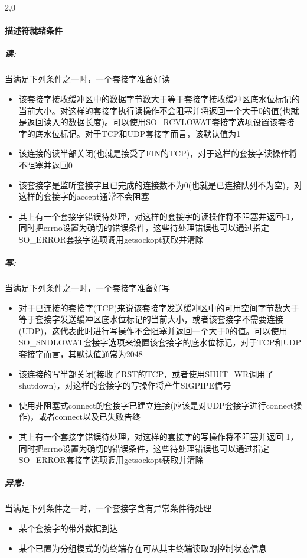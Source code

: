 \begin{spacing}{2,0}
\paragraph{描述符就绪条件}
\subparagraph{读:} 当满足下列条件之一时，一个套接字准备好读
\begin{itemize}
	\item[1.] 该套接字接收缓冲区中的数据字节数大于等于套接字接收缓冲区底水位标记的当前大小。对这样的套接字执行读操作不会阻塞并将返回一个大于0的值(也就是返回读入的数据长度)。可以使用SO\_RCVLOWAT套接字选项设置该套接字的底水位标记。对于TCP和UDP套接字而言，该默认值为1
	\item[2.] 该连接的读半部关闭(也就是接受了FIN的TCP)，对于这样的套接字读操作将不阻塞并返回0
	\item[3.] 该套接字是监听套接字且已完成的连接数不为0(也就是已连接队列不为空)，对这样的套接字的accept通常不会阻塞
	\item[4.] 其上有一个套接字错误待处理，对这样的套接字的读操作将不阻塞并返回-1，同时把errno设置为确切的错误条件，这些待处理错误也可以通过指定SO\_ERROR套接字选项调用getsockopt获取并清除
\end{itemize}
\newpage
\subparagraph{写:} 当满足下列条件之一时，一个套接字准备好写
\begin{itemize}
	\item[1.] 对于已连接的套接字(TCP)来说该套接字发送缓冲区中的可用空间字节数大于等于套接字发送缓冲区底水位标记的当前大小，或者该套接字不需要连接(UDP)，这代表此时进行写操作不会阻塞并返回一个大于0的值。可以使用SO\_SNDLOWAT套接字选项来设置该套接字的底水位标记，对于TCP和UDP套接字而言，其默认值通常为2048
	\item[2.] 该连接的写半部关闭(接收了RST的TCP，或者使用SHUT\_WR调用了shutdown)，对这样的套接字的写操作将产生SIGPIPE信号
	\item[3.] 使用非阻塞式connect的套接字已建立连接(应该是对UDP套接字进行connect操作)，或者connect以及已失败告终
	\item[4.] 其上有一个套接字错误待处理，对这样的套接字的写操作将不阻塞并返回-1，同时把errno设置为确切的错误条件，这些待处理错误也可以通过指定SO\_ERROR套接字选项调用getsockopt获取并清除
\end{itemize}

\subparagraph{异常:} 当满足下列条件之一时，一个套接字含有异常条件待处理
\begin{itemize}
	\item[1.] 某个套接字的带外数据到达
	\item[2.] 某个已置为分组模式的伪终端存在可从其主终端读取的控制状态信息
\end{itemize}
\end{spacing}
\newpage

